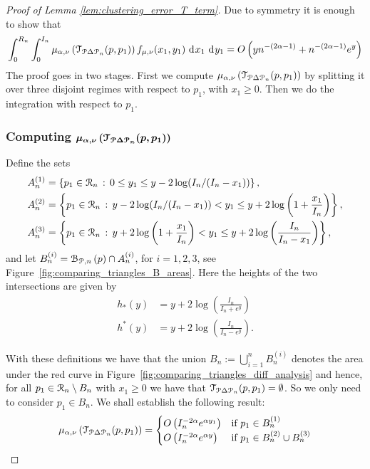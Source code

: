 \begin{proof}[Proof of Lemma \ref{lem:clustering_error_T_term}]
Due to symmetry it is enough to show that
\begin{equation}\label{eq:clustering_error_T_main}
	\int_0^{R_n}\int_0^{I_n} \mu_{\alpha, \nu}\left(\mathcal{T}_{{\mathcal P} \Delta {\mathcal P}_n}(p,p_1)\right) f_{\mu, \nu}(x_1,y_1) 
	\operatorname{\, \mathrm{d}\hspace{-1pt}} x_1 \operatorname{\, \mathrm{d}\hspace{-1pt}} y_1 = O\left(y n^{-(2\alpha - 1)} + n^{-(2\alpha-1)} e^{y}\right)
\end{equation}
The proof goes in two stages. First we compute $\mu_{\alpha, \nu}\left(\mathcal{T}_{{\mathcal P} \Delta {\mathcal P}_n}(p,p_1)\right)$ by splitting it over three disjoint regimes with respect to $p_1$, with $x_1 \ge 0$. Then we do the integration with respect to $p_1$.

\subsubsection*{Computing $\bm{\mu_{\alpha, \nu}\left(\mathcal{T}_{{\mathcal P} \Delta {\mathcal P}_n}(p,p_1)\right)}$}


Define the sets
\begin{align*}
	A_n^{(1)} &= \left\{p_1 \in {\mathcal R}_n \, : \, 0 \le y_1 \le y - 2\log(I_n/(I_n-x_1)) \right\},\\
	A_n^{(2)} &= \left\{p_1 \in {\mathcal R}_n \, : \, y - 2\log(I_n/(I_n-x_1)) < y_1 
		\le y + 2 \log\left(1 + \frac{x_1}{I_n}\right)\right\},\\
	A_n^{(3)} &= \left\{p_1 \in {\mathcal R}_n \, : \, y + 2 \log\left(1 + \frac{x_1}{I_n}\right) < y_1 
			\le y + 2 \log\left(\frac{I_n}{I_n-x_1}\right)\right\},
\end{align*}
and let $B_n^{(i)} = {\mathcal B}_{{\mathcal P},n}\left(p\right) \cap A_n^{(i)}$, for $i = 1, 2, 3$, see Figure~\ref{fig:comparing_triangles_B_areas}. Here the heights of the two intersections are given by
\begin{align}
	h_\ast(y) &= y + 2 \log\left(\frac{I_n}{I_n + e^y}\right)\\
	h^\ast(y) &= y + 2 \log\left(\frac{I_n}{I_n - e^y}\right).
\end{align}

With these definitions we have that the union $B_n := \bigcup_{i = 1}^n B_n^{(i)}$ denotes the area under the red curve in Figure~\ref{fig:comparing_triangles_diff_analysis} and hence, for all $p_1 \in {\mathcal R}_n\setminus B_n$ with $x_1 \ge 0$ we have that $\mathcal{T}_{{\mathcal P} \Delta {\mathcal P}_n}(p,p_1) = \emptyset$. So we only need to consider $p_1 \in B_n$. We shall establish the following result:
\begin{equation}\label{eq:mu_triangle_diff}
	\mu_{\alpha, \nu}\left(\mathcal{T}_{{\mathcal P} \Delta {\mathcal P}_n}(p,p_1)\right) = 
	\begin{cases}
		O\left(I_n^{-2\alpha} e^{\alpha y_1}\right) &\mbox{if } p_1 \in B_n^{(1)}\\
		O\left(I_n^{-2\alpha} e^{\alpha y}\right) &\mbox{if } p_1 \in B_n^{(2)} \cup B_n^{(3)}
	\end{cases}
\end{equation}


\end{proof}
